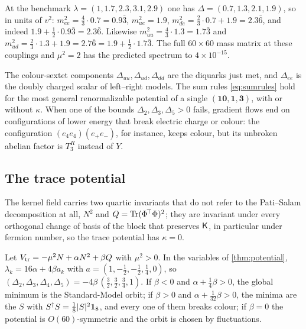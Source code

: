 \begin{example}
\label{ex:sumrule}
At the benchmark $\lambda=(1,1.7,2.3,3.1,2.9)$ one has $\Delta=(0.7,1.3,2.1,1.9)$, so in units of $v^2$: $m_{ee}^2=\tfrac43\cdot0.7=0.9\overline3$,
$m_{ue}^2=1.9$, $m_{de}^2=\tfrac23\cdot0.7+1.9=2.3\overline6$, and indeed $1.9+\tfrac12\cdot0.9\overline3=2.3\overline6$. Likewise $m_{uu}^2=\tfrac43\cdot1.3=1.7\overline3$
and $m_{ud}^2=\tfrac23\cdot1.3+1.9=2.7\overline6=1.9+\tfrac12\cdot1.7\overline3$. The full $60\times60$ mass matrix at these couplings and $\mu^2=2$ has the
predicted spectrum to $4\times10^{-15}$.
\end{example}

The colour-sextet components $\Delta_{uu},\Delta_{ud},\Delta_{dd}$ are the diquarks just met, and $\Delta_{ee}$ is the doubly charged scalar of left--right models.
The sum rules \eqref{eq:sumrules} hold for the most general renormalizable potential of a single $(\mathbf{10},\mathbf1,\mathbf3)$, with or without $\kappa$. When one of the
bounds $\Delta_2,\Delta_3,\Delta_5>0$ fails, gradient flows end on configurations of lower energy that break electric charge or colour: the configuration
$(e_4e_4)(e_+e_-)$, for instance, keeps colour, but its unbroken abelian factor is $T^R_3$ instead of $Y$.

\subsection{The trace potential}

The kernel field carries two quartic invariants that do not refer to the Pati--Salam decomposition at all, $N^2$ and $Q=\operatorname{Tr}(\Phi^{\!\top}\Phi)^2$; they are
invariant under every orthogonal change of basis of the block that preserves $\mathsf K$, in particular under fermion number, so the trace potential has
$\kappa=0$.

\begin{theorem}
\label{thm:tracepot}
Let $V_{\rm tr}=-\mu^2N+\alpha N^2+\beta Q$ with $\mu^2>0$. In the variables of \cref{thm:potential}, $\lambda_k=16\alpha+4\beta a_k$ with $a=(1,-\tfrac12,-\tfrac12,\tfrac14,0)$,
so $(\Delta_2,\Delta_3,\Delta_4,\Delta_5)=-4\beta\,(\tfrac32,\tfrac32,\tfrac34,1)$. If $\beta<0$ and $\alpha+\tfrac14\beta>0$, the global minimum is the Standard-Model orbit; if
$\beta>0$ and $\alpha+\tfrac1{32}\beta>0$, the minima are the $S$ with $S^\dagger S=\tfrac18|S|^2\mathbf 1_8$, and every one of them breaks colour; if $\beta=0$ the potential is
$O(60)$-symmetric and the orbit is chosen by fluctuations.
\end{theorem}

